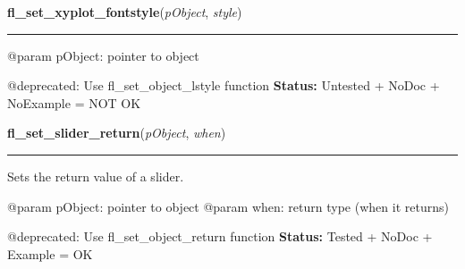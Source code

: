 \hspace{.8\funcindent}\begin{boxedminipage}{\funcwidth}

    \raggedright \textbf{fl\_set\_xyplot\_fontstyle}(\textit{pObject}, \textit{style})

    \vspace{-1.5ex}

    \rule{\textwidth}{0.5\fboxrule}
\setlength{\parskip}{2ex}

@param pObject: pointer to object

@deprecated: Use fl\_set\_object\_lstyle function
\setlength{\parskip}{1ex}
\textbf{Status:} 
Untested + NoDoc + NoExample = NOT OK


    \end{boxedminipage}

    \label{xformslib:deprecated:fl_set_slider_return}

    \vspace{0.5ex}

\hspace{.8\funcindent}\begin{boxedminipage}{\funcwidth}

    \raggedright \textbf{fl\_set\_slider\_return}(\textit{pObject}, \textit{when})

    \vspace{-1.5ex}

    \rule{\textwidth}{0.5\fboxrule}
\setlength{\parskip}{2ex}

Sets the return value of a slider.

@param pObject: pointer to object
@param when: return type (when it returns)

@deprecated: Use fl\_set\_object\_return function
\setlength{\parskip}{1ex}
\textbf{Status:} 
Tested + NoDoc + Example = OK


    \end{boxedminipage}

    \label{xformslib:deprecated:fl_set_positioner_return}

    \vspace{0.5ex}

